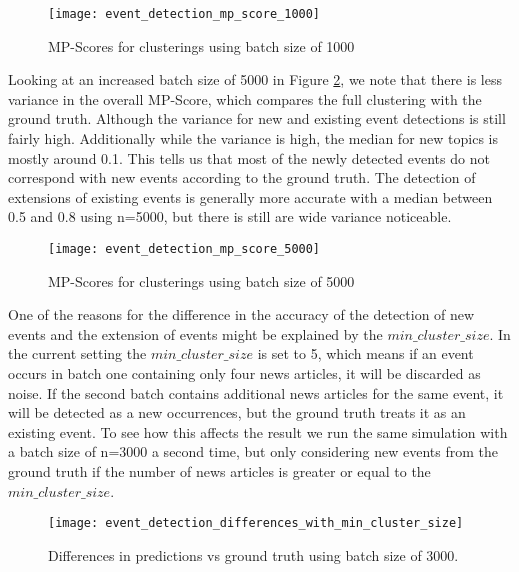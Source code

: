 \begin{figure}[h]
    \centering
    \texttt{[image: event\_detection\_mp\_score\_1000]}
    \caption{MP-Scores for clusterings using batch size of 1000}
    \label{fig:event_detection_mp_score_1000}
\end{figure}

Looking at an increased batch size of 5000 in Figure \ref{fig:event_detection_mp_score_5000},
we note that there is less variance in the overall MP-Score, which compares the full clustering with the ground truth.
Although the variance for new and existing event detections is still fairly high.
Additionally while the variance is high, the median for new topics is mostly around 0.1.
This tells us that most of the newly detected events do not correspond with new events according to the ground truth.
The detection of extensions of existing events is generally more accurate with a median between 0.5 and 0.8 using n=5000,
but there is still are wide variance noticeable.

\begin{figure}[h]
    \centering
    \texttt{[image: event\_detection\_mp\_score\_5000]}
    \caption{MP-Scores for clusterings using batch size of 5000}
    \label{fig:event_detection_mp_score_5000}
\end{figure}

One of the reasons for the difference in the accuracy of the detection of new events and the extension of events
might be explained by the $min\_cluster\_size$.
In the current setting the $min\_cluster\_size$ is set to 5,
which means if an event occurs in batch one containing only four news articles,
it will be discarded as noise.
If the second batch contains additional news articles for the same event,
it will be detected as a new occurrences, but the ground truth treats it as an existing event.
To see how this affects the result we run the same simulation with a batch size of n=3000 a second time,
but only considering new events from the ground truth
if the number of news articles is greater or equal to the $min\_cluster\_size$.

\begin{figure}[h]
    \centering
    \texttt{[image: event\_detection\_differences\_with\_min\_cluster\_size]}
    \caption{Differences in predictions vs ground truth using batch size of 3000.}
    \label{fig:event_detection_differences_with_min_cluster_size}
\end{figure}

